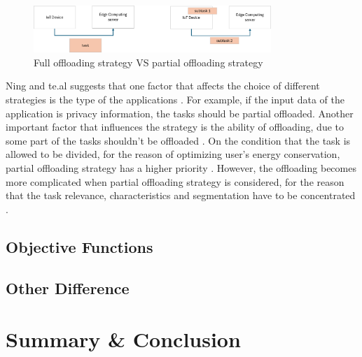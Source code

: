 \documentclass[a4paper,11pt]{article}
\begin{document}
\begin{figure}[h]
        \centering
        \includegraphics[width=0.8\textwidth]{offloading.png}
        \caption{Full offloading strategy VS partial offloading strategy}
\end{figure}
Ning and te.al suggests that one factor that affects the choice of different strategies is the type of the applications \cite{A_Cooperative_Partial_Computation_Offloading_Scheme_for_Mobile_Edge}. For example, if the input data of the application is privacy information, the tasks should be partial offloaded. Another important factor that influences the strategy is the ability of offloading, due to some part of the tasks shouldn't be offloaded \cite{A_Cooperative_Partial_Computation_Offloading_Scheme_for_Mobile_Edge}. On the condition that the task is allowed to be divided, for the reason of optimizing user's energy conservation, partial offloading strategy has a higher priority \cite{save_energy}. However, the offloading becomes more complicated when partial offloading strategy is considered, for the reason that the task relevance, characteristics and segmentation have to be concentrated \cite{user_central}. 

\subsection{Objective Functions}

\subsection{Other Difference}


\section{Summary \& Conclusion}




\small
\end{document}
